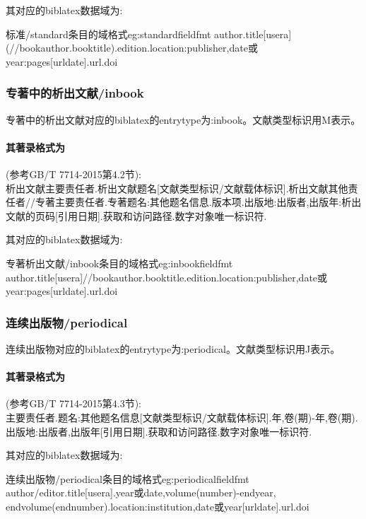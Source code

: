 其对应的biblatex数据域为:
\begin{codetex}{标准/standard条目的域格式}{eg:standardfieldfmt}
author.title[usera](//bookauthor.booktitle).edition.location:publisher,date或year:pages[urldate].url.doi
\end{codetex}


\subsubsection{专著中的析出文献/inbook}
\begin{refentry}{}{}
专著中的析出文献对应的biblatex的entrytype为:inbook。文献类型标识用M表示。

\paragraph{其著录格式为}(参考GB/T 7714-2015第4.2节):\\
析出文献主要责任者.析出文献题名[文献类型标识/文献载体标识].析出文献其他责任者//专著主要责任者.专著题名:其他题名信息.版本项.出版地:出版者,出版年:析出文献的页码[引用日期].获取和访问路径.数字对象唯一标识符.
\end{refentry}

其对应的biblatex数据域为:
\begin{codetex}{专著析出文献/inbook条目的域格式}{eg:inbookfieldfmt}
author.title[usera]//bookauthor.booktitle.edition.location:publisher,date或year:pages[urldate].url.doi
\end{codetex}

\subsubsection{连续出版物/periodical}
\begin{refentry}{}{}
连续出版物对应的biblatex的entrytype为:periodical。文献类型标识用J表示。

\paragraph{其著录格式为}(参考GB/T 7714-2015第4.3节):\\
主要责任者.题名:其他题名信息[文献类型标识/文献载体标识].年,卷(期)-年,卷(期).出版地:出版者,出版年[引用日期].获取和访问路径.数字对象唯一标识符.
\end{refentry}

其对应的biblatex数据域为:
\begin{codetex}{连续出版物/periodical条目的域格式}{eg:periodicalfieldfmt}
author/editor.title[usera].year或date,volume(number)-endyear, endvolume(endnumber).location:institution,date或year[urldate].url.doi
\end{codetex}

